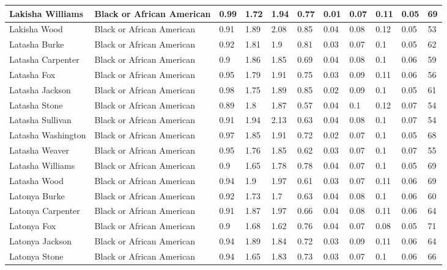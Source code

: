 \begin{table}[!ht]
\begin{tabular}{|l|l|l|l|l|l|l|l|l|l|l|}
        Lakisha Williams & Black or African American & 0.99 & 1.72 & 1.94 & 0.77 & 0.01 & 0.07 & 0.11 & 0.05 & 69 \\ \hline
        Lakisha Wood & Black or African American & 0.91 & 1.89 & 2.08 & 0.85 & 0.04 & 0.08 & 0.12 & 0.05 & 53 \\ \hline
        Latasha Burke & Black or African American & 0.92 & 1.81 & 1.9 & 0.81 & 0.03 & 0.07 & 0.1 & 0.05 & 62 \\ \hline
        Latasha Carpenter & Black or African American & 0.9 & 1.86 & 1.85 & 0.69 & 0.04 & 0.08 & 0.1 & 0.06 & 59 \\ \hline
        Latasha Fox & Black or African American & 0.95 & 1.79 & 1.91 & 0.75 & 0.03 & 0.09 & 0.11 & 0.06 & 56 \\ \hline
        Latasha Jackson & Black or African American & 0.98 & 1.75 & 1.89 & 0.85 & 0.02 & 0.09 & 0.1 & 0.05 & 61 \\ \hline
        Latasha Stone & Black or African American & 0.89 & 1.8 & 1.87 & 0.57 & 0.04 & 0.1 & 0.12 & 0.07 & 54 \\ \hline
        Latasha Sullivan & Black or African American & 0.91 & 1.94 & 2.13 & 0.63 & 0.04 & 0.08 & 0.1 & 0.07 & 54 \\ \hline
        Latasha Washington & Black or African American & 0.97 & 1.85 & 1.91 & 0.72 & 0.02 & 0.07 & 0.1 & 0.05 & 68 \\ \hline
        Latasha Weaver & Black or African American & 0.95 & 1.76 & 1.85 & 0.62 & 0.03 & 0.07 & 0.1 & 0.07 & 55 \\ \hline
        Latasha Williams & Black or African American & 0.9 & 1.65 & 1.78 & 0.78 & 0.04 & 0.07 & 0.1 & 0.05 & 69 \\ \hline
        Latasha Wood & Black or African American & 0.94 & 1.9 & 1.97 & 0.61 & 0.03 & 0.07 & 0.11 & 0.06 & 69 \\ \hline
        Latonya Burke & Black or African American & 0.92 & 1.73 & 1.7 & 0.63 & 0.04 & 0.08 & 0.1 & 0.06 & 60 \\ \hline
        Latonya Carpenter & Black or African American & 0.91 & 1.87 & 1.97 & 0.66 & 0.04 & 0.08 & 0.11 & 0.06 & 64 \\ \hline
        Latonya Fox & Black or African American & 0.9 & 1.68 & 1.62 & 0.76 & 0.04 & 0.07 & 0.08 & 0.05 & 71 \\ \hline
        Latonya Jackson & Black or African American & 0.94 & 1.89 & 1.84 & 0.72 & 0.03 & 0.09 & 0.11 & 0.06 & 64 \\ \hline
        Latonya Stone & Black or African American & 0.94 & 1.65 & 1.83 & 0.73 & 0.03 & 0.07 & 0.1 & 0.06 & 66 \\ \hline

\end{tabular}
\end{table}
